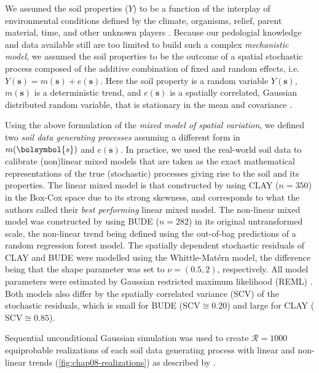 We assumed the soil properties ($Y$) to be a function of the interplay of environmental conditions defined by 
the climate, organisms, relief, parent material, time, and other unknown players \cite{Jenny1994, 
McBratneyEtAl2003, Florinsky2012}. Because our pedologial knowledge and data available still are too limited 
to build such a complex \emph{mechanistic model}, we assumed the soil properties to be the outcome of a 
spatial stochastic process composed of the additive combination of fixed and random effects, i.e. 
$Y(\boldsymbol{s}) = m(\boldsymbol{s}) + e(\boldsymbol{s})$. Here the soil property is a random variable 
$Y(\boldsymbol{s})$, $m(\boldsymbol{s})$ is a deterministic trend, and $e(\boldsymbol{s})$ is a spatially 
correlated, Gaussian distributed random variable, that is stationary in the mean and covariance 
\cite{HeuvelinkEtAl2001}.

Using the above formulation of the \emph{mixed model of spatial variation}, we defined two \emph{soil 
data generating processes} assuming a different form in $m(\bolsymbol{s})$ and $e(\boldsymbol{s})$. In 
practice, we used the real-world soil data to calibrate (non)linear mixed models that are taken as the exact 
mathematical representations of the true (stochastic) processes giving rise to the soil and its properties. 
The linear mixed model is that constructed by \citet{Samuel-RosaEtAl2015} using CLAY ($n = 350$) in the 
Box-Cox space due to its strong skewness, and corresponds to what the authors called their \emph{best 
performing} linear mixed model. The non-linear mixed model was constructed by \citet{Samuel-RosaEtAl} using 
BUDE ($n = 282$) in its original untransformed scale, the non-linear trend being defined using the out-of-bag 
predictions of a random regression forest model. The spatially dependent stochastic residuals of CLAY and BUDE 
were modelled using the Whittle-Matérn model, the difference being that the shape parameter was set to $\nu = 
(0.5, 2)$, respectively. All model parameters were estimated by Gaussian restricted maximum likelihood (REML) 
\cite{LarkEtAl2004, DiggleEtAl2007}. Both models also differ by the spatially correlated variance (SCV) of the 
stochastic residuals, which is small for BUDE ($\text{SCV} \cong 0.20$) and large for CLAY ($\text{SCV} \cong 
0.85$).

Sequential unconditional Gaussian simulation was used to create $\mathcal{R} = 1000$ equiprobable realizations 
of each soil data generating process with linear and non-linear trends (\autoref{fig:chap08-realizations}) as 
described by \citet{Samuel-RosaEtAl}.
 
